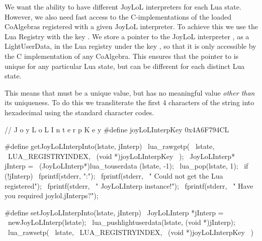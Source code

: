 
We want the ability to have different JoyLoL interpreters for each Lua 
state. However, we also need fast access to the C-implementations of the 
loaded CoAlgebras registered with a given JoyLoL interpreter. To achieve 
this we use the Lua Registry with the  key 
. We store a pointer to the JoyLoL interpreter 
, as a LightUserData, in the Lua registry under the key 
, so that it is only accessible by the C 
implementation of any CoAlgebra. This ensures that the pointer to 
 is unique for any particular Lua state, but can be 
different for each distinct Lua state. 

This means that  must be a unique value, but has no 
meaningful value \emph{other than} its uniqueness. To do this we 
transliterate the first 4 characters of the string  
into hexadecimal using the standard  character codes. 

\startCHeader
//                         J o y L o L I n t e r p K e y
#define joyLoLInterpKey 0x4A6F794CL

#define getJoyLoLInterpInto(lstate, jInterp)      \
  lua_rawgetp(                                    \
    lstate,                                       \
    LUA_REGISTRYINDEX,                            \
    (void *)joyLoLInterpKey                       \
  );                                              \
  JoyLoLInterp* jInterp =                         \
    (JoyLoLInterp*)lua_touserdata (lstate, -1);   \
  lua_pop(lstate, 1);                             \
  if (!jInterp) {                                 \
    fprintf(stderr, "\nERROR:\n");                \
    fprintf(stderr,                               \
      "  Could not get the Lua registered\n");    \
    fprintf(stderr,                               \
      "  JoyLoLInterp instance!\n");              \
    fprintf(stderr,                               \
      "  Have you required joylol.jInterps?\n");  \
  }
\stopCHeader

\setCHeaderStream{private}
\startCHeader
#define setJoyLoLInterpInto(lstate, jInterp)      \
  JoyLoLInterp *jInterp =                         \
    newJoyLoLInterp(lstate);                      \
  lua_pushlightuserdata(lstate, (void *)jInterp); \
  lua_rawsetp(                                    \
    lstate,                                       \
    LUA_REGISTRYINDEX,                            \
    (void *)joyLoLInterpKey                       \
  )
\stopCHeader
\setCHeaderStream{public}

